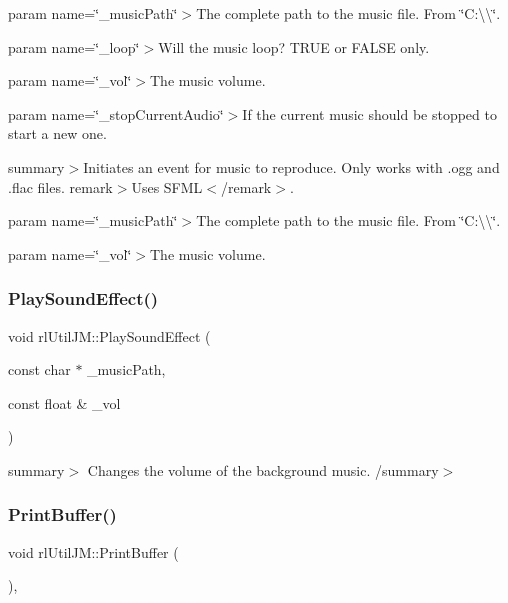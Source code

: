 param name=\char`\"{}\+\_\+music\+Path\char`\"{}$>$The complete path to the music file. From \char`\"{}\+C\+:\textbackslash{}\textbackslash{}\char`\"{}.

param name=\char`\"{}\+\_\+loop\char`\"{}$>$Will the music loop? T\+R\+UE or F\+A\+L\+SE only.

param name=\char`\"{}\+\_\+vol\char`\"{}$>$The music volume.

param name=\char`\"{}\+\_\+stop\+Current\+Audio\char`\"{}$>$If the current music should be stopped to start a new one.

summary$>$Initiates an event for music to reproduce. Only works with .ogg and .flac files. remark$>$Uses S\+F\+ML$<$/remark$>$.

param name=\char`\"{}\+\_\+music\+Path\char`\"{}$>$The complete path to the music file. From \char`\"{}\+C\+:\textbackslash{}\textbackslash{}\char`\"{}.

param name=\char`\"{}\+\_\+vol\char`\"{}$>$The music volume.\mbox{\label{classrl_util_j_m_a5cc8ccacbff13db4c30a8062931abc8a}} 
\subsubsection{\texorpdfstring{Play\+Sound\+Effect()}{PlaySoundEffect()}}
{\footnotesize\ttfamily void rl\+Util\+J\+M\+::\+Play\+Sound\+Effect (\begin{DoxyParamCaption}\item[{const char $\ast$}]{\+\_\+music\+Path,  }\item[{const float \&}]{\+\_\+vol }\end{DoxyParamCaption})\hspace{0.3cm}{\ttfamily [static]}}

summary$>$ Changes the volume of the background music. /summary$>$ \mbox{\label{classrl_util_j_m_addc07d316aedfb7a7aa13bd774a7ad06}} 
\subsubsection{\texorpdfstring{Print\+Buffer()}{PrintBuffer()}}
{\footnotesize\ttfamily void rl\+Util\+J\+M\+::\+Print\+Buffer (\begin{DoxyParamCaption}{ }\end{DoxyParamCaption})\hspace{0.3cm}{\ttfamily [static]}, {\ttfamily [protected]}}

